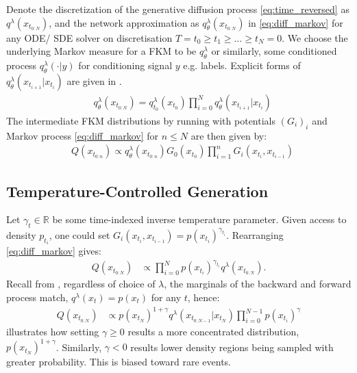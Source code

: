 Denote the discretization of the generative diffusion process \eqref{eq:time_reversed} as $q^\lambda(x_{t_{0:N}})$, and the network approximation as $q_\theta^\lambda(x_{t_{0:N}})$ in \eqref{eq:diff_markov} for any ODE/ SDE solver on discretisation {${T=t_0 \geq t_1 \geq \ldots \geq t_N=0}$}. We choose the underlying Markov measure for a FKM to be $q^\lambda_\theta$ or similarly, some conditioned process $q^\lambda_\theta(\cdot|y)$ for conditioning signal $y$ e.g. labels. Explicit forms of ${q}_\theta^\lambda(x_{t_{i+1}}|x_{t_{i}})$ are given in .
\vspace{-0.1cm}
\begin{align}\label{eq:diff_markov}
    &{q}_\theta^\lambda(x_{t_{0:N}}) = q^\lambda_{t_0}(x_{t_0})\prod_{i=0}^N {q}_\theta^\lambda(x_{t_{i+1}}|x_{t_{i}}) 
\end{align}
The intermediate FKM distributions by running  with potentials $(G_i)_i$ and Markov process \eqref{eq:diff_markov} for $n\leq N$ are then given by:
\vspace{-0.3cm}
\begin{align}\label{eq:fkm_diff}
    &Q(x_{t_{0:n}}) \propto {q}_\theta^\lambda(x_{t_{0:n}})G_0(x_{t_0})\prod_{i=1}^{n}G_i(x_{t_i},x_{t_{i-1}})
\end{align}
\vspace{-0.5cm}
\subsection{Temperature-Controlled Generation}
Let $\gamma_t \in \mathbb{R}$ be some time-indexed inverse temperature parameter. Given access to density $p_{t_i}$, one could set $G_i(x_{t_i}, x_{t_{i-1}})=p(x_{t_i})^{\gamma_{t_i}}$. Rearranging \eqref{eq:diff_markov} gives:
\begin{align*}
    Q(x_{t_{0:N}}) &\propto \prod_{i=0}^{N}p(x_{t_i})^{\gamma_{t_i}}q^\lambda(x_{t_{0:N}}). 
\end{align*}
Recall from , regardless of choice of $\lambda$, the marginals of the backward and forward process match, $q^\lambda(x_{t})=p(x_{t})$ for any $t$, hence:
\begin{align*}
    Q(x_{t_{0:N}}) &\propto p(x_{t_N})^{1+\gamma}q^\lambda(x_{t_{0:N-1}}|x_{t_N})\prod_{i=0}^{N-1}p(x_{t_i})^\gamma  \label{eq:diff_fk_measure} 
\end{align*}
 illustrates how setting $\gamma \geq 0$ results a more concentrated distribution, $p(x_{t_N})^{1+\gamma}$. Similarly,  $\gamma<0$ results lower density regions being sampled with greater probability. This is biased toward rare events.  

